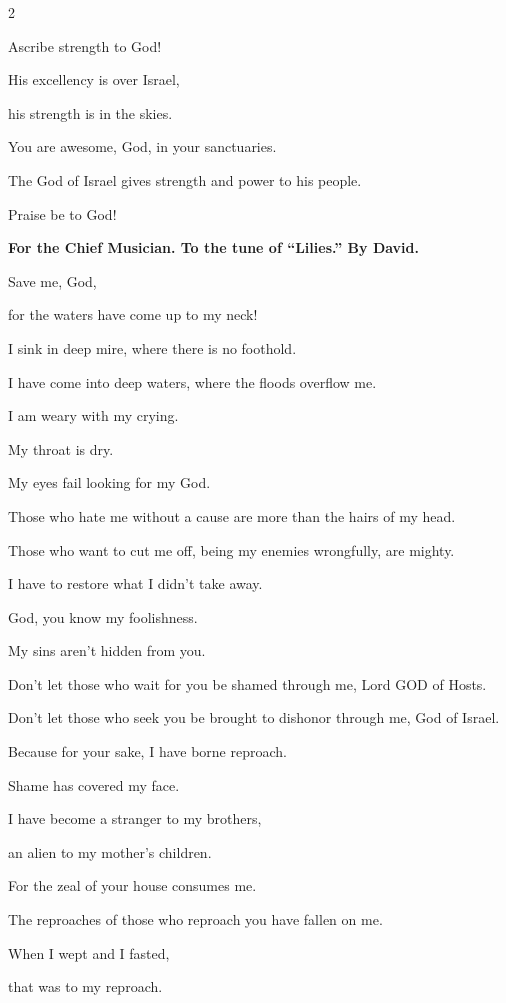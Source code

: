 \begin{multicols}{2}
	
	\myverse{}Ascribe strength to God!
	
	His excellency is over Israel,
	
	his strength is in the skies.
	
	
	\myverse{}You are awesome, God, in your sanctuaries.
	
	The God of Israel gives strength and power to his people.
	
	Praise be to God!
	
	
	\mychapter{}\textbf{For the Chief Musician. To the tune of “Lilies.” By David.}
	
	\myverse*{}Save me, God,
	
	for the waters have come up to my neck!
	
	
	\myverse{}I sink in deep mire, where there is no foothold.
	
	I have come into deep waters, where the floods overflow me.
	
	
	\myverse{}I am weary with my crying.
	
	My throat is dry.
	
	My eyes fail looking for my God.
	
	
	\myverse{}Those who hate me without a cause are more than the hairs of
	my head.
	
	Those who want to cut me off, being my enemies wrongfully, are mighty.
	
	I have to restore what I didn’t take away.
	
	
	\myverse{}God, you know my foolishness.
	
	My sins aren’t hidden from you.
	
	
	\myverse{}Don’t let those who wait for you be shamed through me, Lord GOD
	of Hosts.
	
	Don’t let those who seek you be brought to dishonor through me, God of Israel.
	
	
	\myverse{}Because for your sake, I have borne reproach.
	
	Shame has covered my face.
	
	
	\myverse{}I have become a stranger to my brothers,
	
	an alien to my mother’s children.
	
	
	\myverse{}For the zeal of your house consumes me.
	
	The reproaches of those who reproach you have fallen on me.
	
	
	\myverse{}When I wept and I fasted,
	
	that was to my reproach.
	

\end{multicols}
